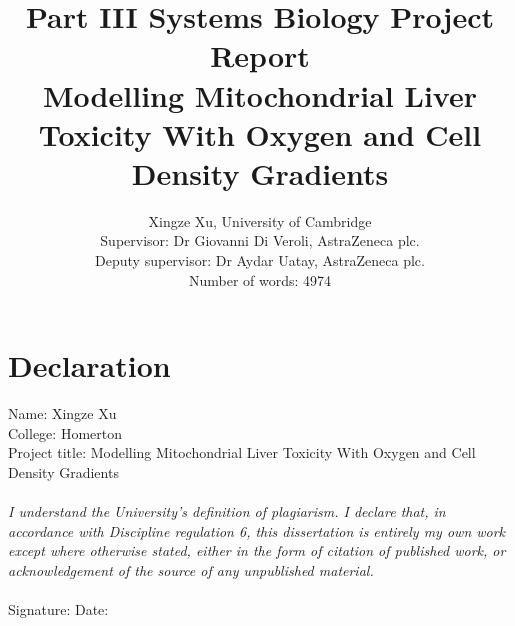 \documentclass[12pt]{article}
\title{Part III Systems Biology Project Report\\
\textbf{Modelling Mitochondrial Liver Toxicity With Oxygen and Cell Density Gradients} }
\author{Xingze Xu, University of Cambridge\\
Supervisor: Dr Giovanni Di Veroli, AstraZeneca plc.\\
Deputy supervisor: Dr Aydar Uatay, AstraZeneca plc.\\
Number of words: 4974}
\date{}
\begin{document}
\maketitle
\thispagestyle{empty}
\pagebreak
\thispagestyle{empty}
\section*{Declaration}
Name: Xingze Xu\\
College: Homerton\\
Project title: Modelling Mitochondrial Liver Toxicity With Oxygen and Cell Density Gradients\\
\\
\textit{I understand the University’s definition of plagiarism. I declare that, in accordance with Discipline regulation 6, this dissertation is entirely my own work except where otherwise stated, either in the form of citation of published work, or acknowledgement of the source of any unpublished material.}\\\\
Signature:  \quad\quad\quad\quad\quad\quad\quad\quad\quad\quad\quad\quad      \quad \quad      Date:
\pagebreak
\end{document}

